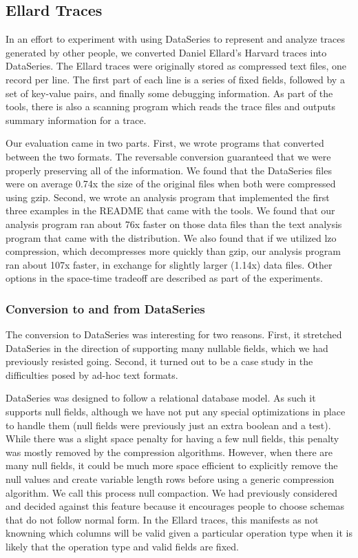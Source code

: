 \subsection{Ellard Traces}\label{sec:ellard}

In an effort to experiment with using DataSeries to represent and
analyze traces generated by other people, we converted Daniel Ellard's
Harvard traces\cite{ellard03} into DataSeries.  The Ellard traces
were originally stored as compressed text files, one record per line.
The first part of each line is a series of fixed fields, followed by a
set of key-value pairs, and finally some debugging information.  As
part of the tools, there is also a scanning program which reads the
trace files and outputs summary information for a trace.

Our evaluation came in two parts.  First, we wrote programs that
converted between the two formats.  The reversable conversion
guaranteed that we were properly preserving all of the information.
We found that the DataSeries files were on average 0.74x the size of
the original files when both were compressed using gzip.  Second, we
wrote an analysis program that implemented the first three examples in
the README that came with the tools.  We found that our analysis
program ran about 76x faster on those data files than the text
analysis program that came with the distribution.  
We also found that if we utilized lzo compression, which decompresses
more quickly than gzip,
our analysis program
ran about 107x faster, in exchange for slightly larger (1.14x) data files.
Other options in the space-time
tradeoff are described as part of the experiments.

\subsubsection{Conversion to and from DataSeries}

The conversion to DataSeries was interesting for two reasons.  First,
it stretched DataSeries in the direction of supporting many nullable
fields, which we had previously resisted going.  Second, it turned out
to be a case study in the difficulties posed by ad-hoc text formats.

DataSeries was designed to follow a relational database model.  As
such it supports null fields, although we have not put any special
optimizations in place to handle them (null fields were previously
just an extra boolean and a test).  While there was a slight space
penalty for having a few null fields, this penalty was mostly removed
by the compression algorithms.  However, when there are many null
fields, it could be much more space efficient to explicitly remove the
null values and create variable length rows before using a generic
compression algorithm.  We call this process null compaction.  We had
previously considered and decided against this feature because it
encourages people to choose schemas that do not follow normal form.
In the Ellard traces, this manifests as not knowning which columns
will be valid given a particular operation type when it is likely that
the operation type and valid fields are fixed.

